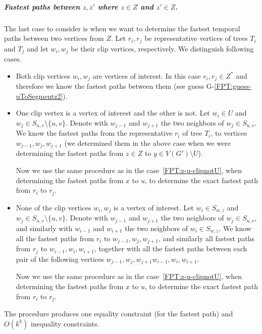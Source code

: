 \documentclass[a4paper,UKenglish,cleveref, autoref, thm-restate]{lipics-v2021}
\begin{document}
\subparagraph{\boldmath Fastest paths between $z,z'$ where $z \in Z$ and $z' \in Z$.}
The last case to consider is when we want to determine the fastest temporal paths between two vertices from $Z$.
Let $r_i, r_j$ be representative vertices of trees $T_i$ and $T_j$ and let $w_i, w_j$ be their clip vertices, respectively.
We distinguish following cases.
\begin{itemize}
    \item  Both clip vertices $w_i,w_j$ are vertices of interest.
    In this case $r_i, r_j \in Z^*$
    and therefore we know the fastest paths between them (see guess G-\ref{FPT:guess-uToSegmentz2}).
    \item One clip vertex is a vertex of interest and the other is not.
    Let $w_i \in U$ and $w_j \in S_{u,v} \setminus \{u,v\}$.
    Denote with $w_{j-1}$ and $w_{j+1}$ the two neighbors of $w_j \in S_{u,v}$.
    We know the fastest paths from the representative $r_i$ of tree $T_i$,
    to vertices $w_{j-1},w_j,w_{j+1}$ 
    (we determined them in the above case 
    when we were determining the fastest paths from $z \in Z$ to $y \in V(G')\setminus U$).
    
    Now we use the same procedure as in
    the case~\ref{FPT:z-u-clipnotU}, when determining the fastest paths from $x$ to $u$,
    to determine the exact fastest path from $r_i$ to $r_j$.
    \item None of the clip vertices $w_i, w_j$ is a vertex of interest.
    Let $w_i \in S_{w,z}$ and $w_j \in S_{u,v} \setminus \{u,v\}$.
    Denote with $w_{j-1}$ and $w_{j+1}$ the two neighbors of $w_j \in S_{u,v}$,
    and 
    similarly with 
    $w_{i-1}$ and $w_{i+1}$ the two neighbors of $w_i \in S_{w,z}$.
    We know all the fastest paths from
    $r_i$ to $w_{j-1},w_j,w_{j+1}$,
    and similarly all fastest paths 
    from $r_j$ to $w_{i-1},w_i,w_{i+1}$,
    together with all the fastest paths between 
    each pair of the following vertices
    $w_{j-1},w_j,w_{j+1} w_{i-1},w_i,w_{i+1}$.
    
    Now we use the same procedure as in
    the case~\ref{FPT:z-u-clipnotU}, when determining the fastest paths from $x$ to $u$,
    to determine the exact fastest path from $r_i$ to $r_j$.
\end{itemize}
The procedure produces one equality constraint (for the fastest path) and $O(k^k)$ inequality constraints.
\end{document}
